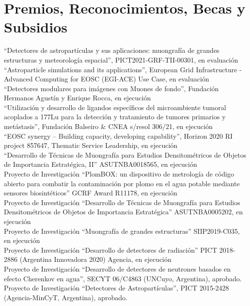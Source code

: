 \section*{Premios, Reconocimientos, Becas y Subsidios}
\noindent
{} ``Detectores de astropartículas y sus aplicaciones: muongrafía de grandes estructuras y meteorología espacial'', PICT2021-GRF-TII-00301, en evaluación\\
 ``Astroparticle simulations and its applications'', European Grid Infrastructure - Advanced Computing for EOSC (EGI-ACE) Use Case, en evaluación\\
 ``Detectores modulares para imágenes con Muones de fondo'', Fundación Hermanos Agustín y Enrique Rocca, en ejecución\\
 ``Utilización y desarrollo de ligandos específicos del microambiente tumoral acoplados a 177Lu para la detección y tratamiento de tumores primarios y metástasis'', Fundación Balseiro \& CNEA s/resol 306/21, en ejecución\\
 ``EOSC synergy – Building capacity, developing capability'', Horizon 2020 RI project 857647, Thematic Service Leadership, en ejecución\\
 ``Desarrollo de Técnicas de Muongrafía para Estudios Densitométricos de Objetos de Importancia Estratégica, II'' ASUTNBA0018565, en ejecución\\
 Proyecto de Investigación ``PlomBOX: un dispositivo de metrología de código abierto para combatir la contaminación por plomo en el agua potable mediante sensores biosintéticos'' GCRF Award R11178, en ejecución\\
 Proyecto de Investigación ``Desarrollo de Técnicas de Muongrafía para Estudios Densitométricos de Objetos de Importancia Estratégica'' ASUTNBA0005202, en ejecución\\
 Proyecto de Investigación ``Muongrafía de grandes estructuras'' SIIP2019-C035, en ejecución\\
 Proyecto de Investigación ``Desarrollo de detectores de radiación'' PICT 2018-2886 (Argentina Innovadora 2020) Agencia, en ejecución\\
 Proyecto de Investigación ``Desarrollo de detectores de neutrones basados en efecto Cherenkov en agua'', SECYT 06/C4863 (UNCuyo, Argentina), aprobado.\\
 Proyecto de Investigación ``Detectores de Astropartículas'', PICT 2015-2428 (Agencia-MinCyT, Argentina), aprobado.\\
